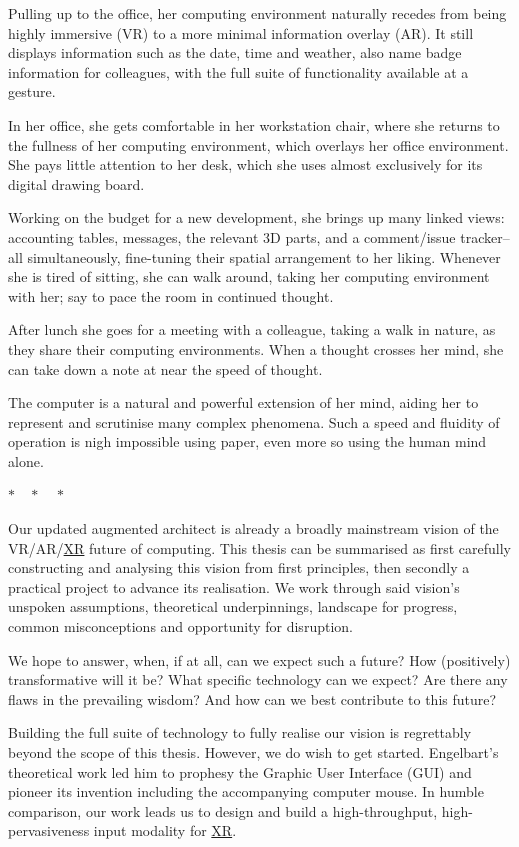 \documentclass[logo,bsc,singlespacing,parskip]{infthesis}
\newcommand{\threestars}{\begin{center}$ {\ast}\quad{\ast}\quad{\ast} $\end{center}}
\begin{document}
Pulling up to the office, her computing environment naturally recedes from being highly immersive (VR) to a more minimal information overlay (AR).
It still displays information such as the date, time and weather, also name badge information for colleagues, with the full suite of functionality available at a gesture.

In her office, she gets comfortable in her workstation chair, where she returns to the fullness of her computing environment, which overlays her office environment.
She pays little attention to her desk, which she uses almost exclusively for its digital drawing board.

Working on the budget for a new development, she brings up many linked views: accounting tables, messages, the relevant 3D parts, and a comment/issue tracker-- all simultaneously, fine-tuning their spatial arrangement to her liking.
Whenever she is tired of sitting, she can walk around, taking her computing environment with her; say to pace the room in continued thought.

After lunch she goes for a meeting with a colleague, taking a walk in nature, as they share their computing environments.
When a thought crosses her mind, she can take down a note at near the speed of thought.

The computer is a natural and powerful extension of her mind, aiding her to represent and scrutinise many complex phenomena.
Such a speed and fluidity of operation is nigh impossible using paper, even more so using the human mind alone.

\threestars
Our updated augmented architect is already a broadly mainstream vision of the VR/AR/\hyperref[org39cbd51]{XR} future of computing.
This thesis can be summarised as first carefully constructing and analysing this vision from first principles, then secondly a practical project to advance its realisation.
We work through said vision's unspoken assumptions, theoretical underpinnings, landscape for progress, common misconceptions and opportunity for disruption.

We hope to answer, when, if at all, can we expect such a future?
How (positively) transformative will it be?
What specific technology can we expect?
Are there any flaws in the prevailing wisdom? 
And how can we best contribute to this future?

Building the full suite of technology to fully realise our vision is regrettably beyond the scope of this thesis.
However, we do wish to get started.
Engelbart's theoretical work \autocite{engelbartAugmentingHumanIntellect1962}  led him to prophesy the Graphic User Interface (GUI) and pioneer its invention including the accompanying computer mouse.
In humble comparison, our work leads us to design and build a high-throughput, high-pervasiveness input modality for \hyperref[org39cbd51]{XR}.
\end{document}
